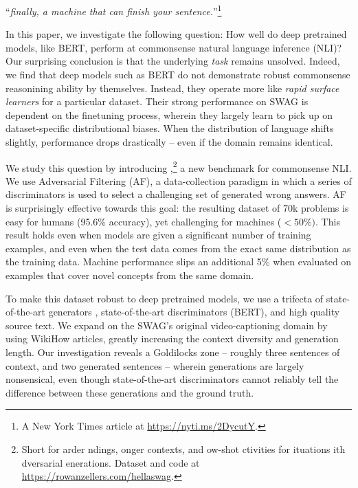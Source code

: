 ``\emph{finally, a machine that can finish your sentence.}''\footnote{A New York Times article at \href{https://nyti.ms/2DycutY}{https://nyti.ms/2DycutY}.}

In this paper, we investigate the following question: How well do deep pretrained models, like BERT, perform at commonsense natural language inference (NLI)? Our surprising conclusion is that the underlying \emph{task} remains unsolved. Indeed, we find that deep models such as BERT do not demonstrate robust commonsense reasonining ability by themselves. Instead, they operate more like \emph{rapid surface learners} for a particular dataset. Their strong performance on {SWAG} is dependent on the finetuning process, wherein they largely learn to pick up on dataset-specific distributional biases. When the distribution of language shifts slightly, performance drops drastically -- even if the domain remains identical.

We study this question by introducing  {},\footnote{Short for {}arder {}ndings, {}onger contexts, and {}ow-shot {}ctivities for {}ituations {}ith {}dversarial {}enerations. Dataset and code at \href{https://rowanzellers.com/hellaswag}{https://rowanzellers.com/hellaswag}.} a new benchmark for commonsense NLI. We use Adversarial Filtering (AF), a data-collection paradigm in which a series of discriminators is used to select a challenging set of generated wrong answers. AF is surprisingly effective towards this goal: the resulting dataset of 70k problems is easy for humans (95.6\% accuracy), yet challenging for machines (${<}50\%)$. This result holds even when models are given a significant number of training examples, and even when the test data comes from the exact same distribution as the training data. Machine performance slips an additional 5\% when evaluated on examples that cover novel concepts from the same domain.

To make this dataset robust to deep pretrained models, we use a trifecta of state-of-the-art generators \cite{radford2018improving}, state-of-the-art discriminators (BERT), and high quality source text. We expand on the SWAG's original video-captioning domain by using WikiHow articles, greatly increasing the context diversity and generation length. Our investigation reveals a Goldilocks zone -- roughly three sentences of context, and two generated sentences -- wherein generations are largely nonsensical, even though state-of-the-art discriminators cannot reliably tell the difference between these generations and the ground truth. 


